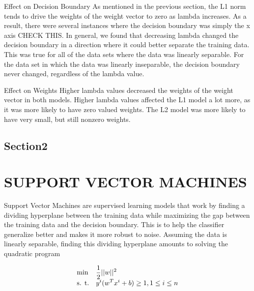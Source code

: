 \documentclass[10pt,twoside]{article}
\begin{document}
Effect on Decision Boundary 
As mentioned in the previous section, the L1 norm tends to drive the weights of the weight vector to zero as lambda increases. As a result, there were several instances where the decision boundary was simply the x axis CHECK THIS. In general, we found that decreasing lambda changed the decision boundary in a direction where it could better separate the training data. This was true for all of the data sets where the data was linearly separable. For the data set in which the data was linearly inseparable, the decision boundary never changed, regardless of the lambda value. 

Effect on Weights
Higher lambda values decreased the weights of the weight vector in both models. Higher lambda values affected the L1 model a lot more, as it was more likely to have zero valued weights. The L2 model was more likely to have very small, but still nonzero weights. 


\subsection{Section2}




\section{\uppercase{Support Vector Machines}}

Support Vector Machines are supervised learning models that work by finding a dividing hyperplane between the training data while maximizing the gap between the training data and the decision boundary. This is to help the classifier generalize better and makes it more robust to noise. Assuming the data is linearly separable, finding this dividing hyperplane amounts to solving the quadratic program

\begin{equation}
\begin{array}{ll@{}ll}
\text{min}  & \displaystyle \frac{1}{2} ||w||^2 &\\
\text{s. t.}& \displaystyle y^i(w^T x^i + b) \geq 1 , 1 \leq i \leq n
\end{array}
\end{equation}
\end{document}
